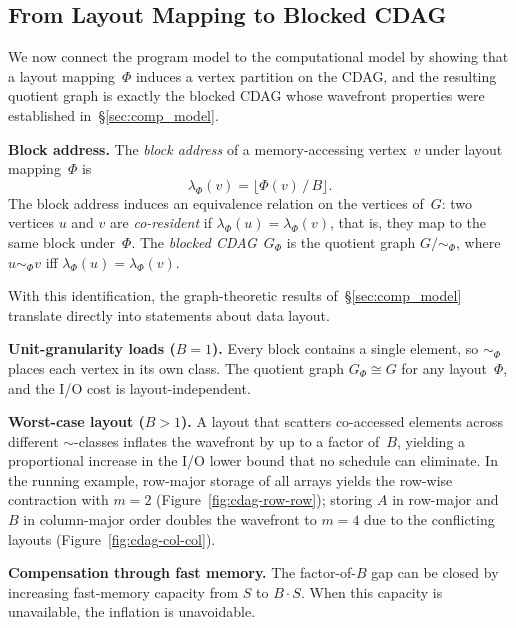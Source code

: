 \subsection{From Layout Mapping to Blocked CDAG}\label{sec:layout_bridge}

We now connect the program model to the computational model by showing that a layout mapping~$\Phi$ induces a vertex partition on the CDAG, and the resulting quotient graph is exactly the blocked CDAG whose wavefront properties were established in~\S\ref{sec:comp_model}.

\textbf{Block address.}  The \emph{block address} of a memory-accessing vertex~$v$ under layout mapping~$\Phi$ is
%
\begin{equation}\label{eq:block-address}
  \lambda_\Phi(v) = \bigl\lfloor \Phi(v) \,/\, B \bigr\rfloor.
\end{equation}
%
The block address induces an equivalence relation on the vertices of~$G$: two vertices $u$ and $v$ are \emph{co-resident} if $\lambda_\Phi(u) = \lambda_\Phi(v)$, that is, they map to the same block under~$\Phi$.  The \emph{blocked CDAG}~$G_\Phi$ is the quotient graph $G/{\sim_\Phi}$, where $u \sim_\Phi v$ iff $\lambda_\Phi(u) = \lambda_\Phi(v)$.

With this identification, the graph-theoretic results of~\S\ref{sec:comp_model} translate directly into statements about data layout.

\textbf{Unit-granularity loads ($B = 1$).}  Every block contains a single element, so $\sim_\Phi$ places each vertex in its own class.  The quotient graph $G_\Phi \cong G$ for any layout~$\Phi$, and the I/O cost is layout-independent.

\textbf{Worst-case layout ($B > 1$).}  A layout that scatters co-accessed elements across different $\sim$-classes inflates the wavefront by up to a factor of~$B$, yielding a proportional increase in the I/O lower bound that no schedule can eliminate.  In the running example, row-major storage of all arrays yields the row-wise contraction with $m = 2$ (Figure~\ref{fig:cdag-row-row}); storing $A$ in row-major and~$B$ in column-major order doubles the wavefront to $m = 4$ due to the conflicting layouts (Figure~\ref{fig:cdag-col-col}).

\textbf{Compensation through fast memory.}  The factor-of-$B$ gap can be closed by increasing fast-memory capacity from $S$ to $B \cdot S$.  When this capacity is unavailable, the inflation is unavoidable.